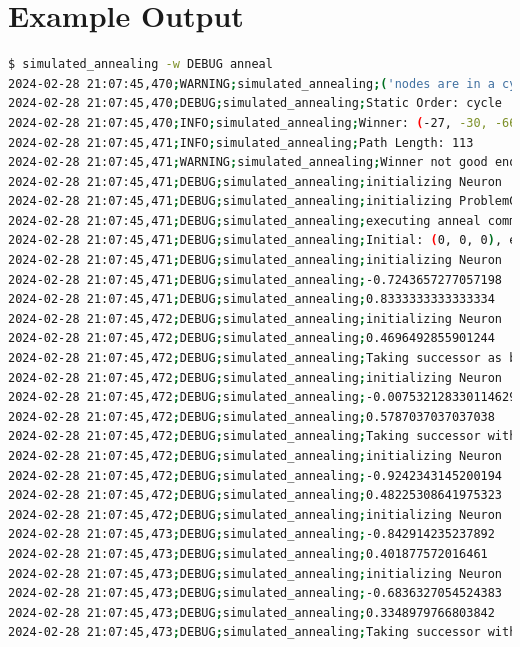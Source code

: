 \documentclass{article}
\begin{document}
\section{Example Output}

\begin{lstlisting}[language=bash, caption=Example Output of Program]
$ simulated_annealing -w DEBUG anneal
2024-02-28 21:07:45,470;WARNING;simulated_annealing;('nodes are in a cycle', [(-23, -30, -67), err=1.000, (-21, -32, -65), err=1.000, (-23, -30, -67), err=1.000])
2024-02-28 21:07:45,470;DEBUG;simulated_annealing;Static Order: cycle
2024-02-28 21:07:45,470;INFO;simulated_annealing;Winner: (-27, -30, -66), err=1.000
2024-02-28 21:07:45,471;INFO;simulated_annealing;Path Length: 113
2024-02-28 21:07:45,471;WARNING;simulated_annealing;Winner not good enough, restarting with attempt #3.
2024-02-28 21:07:45,471;DEBUG;simulated_annealing;initializing Neuron
2024-02-28 21:07:45,471;DEBUG;simulated_annealing;initializing ProblemGraph
2024-02-28 21:07:45,471;DEBUG;simulated_annealing;executing anneal command
2024-02-28 21:07:45,471;DEBUG;simulated_annealing;Initial: (0, 0, 0), err=2.000
2024-02-28 21:07:45,471;DEBUG;simulated_annealing;initializing Neuron
2024-02-28 21:07:45,471;DEBUG;simulated_annealing;-0.7243657277057198
2024-02-28 21:07:45,471;DEBUG;simulated_annealing;0.8333333333333334
2024-02-28 21:07:45,472;DEBUG;simulated_annealing;initializing Neuron
2024-02-28 21:07:45,472;DEBUG;simulated_annealing;0.4696492855901244
2024-02-28 21:07:45,472;DEBUG;simulated_annealing;Taking successor as better option (exploitation)
2024-02-28 21:07:45,472;DEBUG;simulated_annealing;initializing Neuron
2024-02-28 21:07:45,472;DEBUG;simulated_annealing;-0.007532128330114629
2024-02-28 21:07:45,472;DEBUG;simulated_annealing;0.5787037037037038
2024-02-28 21:07:45,472;DEBUG;simulated_annealing;Taking successor with probability 98% (exploration)
2024-02-28 21:07:45,472;DEBUG;simulated_annealing;initializing Neuron
2024-02-28 21:07:45,472;DEBUG;simulated_annealing;-0.9242343145200194
2024-02-28 21:07:45,472;DEBUG;simulated_annealing;0.48225308641975323
2024-02-28 21:07:45,472;DEBUG;simulated_annealing;initializing Neuron
2024-02-28 21:07:45,473;DEBUG;simulated_annealing;-0.842914235237892
2024-02-28 21:07:45,473;DEBUG;simulated_annealing;0.401877572016461
2024-02-28 21:07:45,473;DEBUG;simulated_annealing;initializing Neuron
2024-02-28 21:07:45,473;DEBUG;simulated_annealing;-0.6836327054524383
2024-02-28 21:07:45,473;DEBUG;simulated_annealing;0.3348979766803842
2024-02-28 21:07:45,473;DEBUG;simulated_annealing;Taking successor with probability 12% (exploration)

\end{lstlisting}
\end{document}
